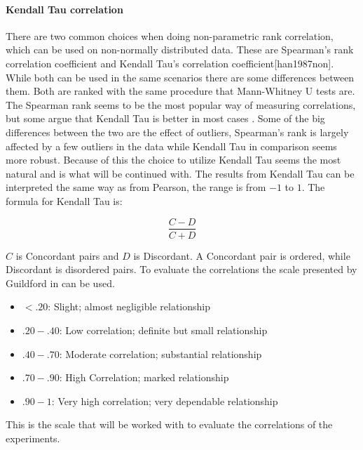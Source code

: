 \paragraph{Kendall Tau correlation}
There are two common choices when doing non-parametric rank correlation, which can be used on non-normally distributed data. These are Spearman's rank correlation coefficient and Kendall Tau's correlation coefficient[han1987non]. While both can be used in the same scenarios there are some differences between them. Both are ranked with the same procedure that Mann-Whitney U tests are. The Spearman rank seems to be the most popular way of measuring correlations, but some argue that Kendall Tau is better in most cases \cite{gilpin1993table}. Some of the big differences between the two are the effect of outliers, Spearman's rank is largely affected by a few outliers in the data while Kendall Tau in comparison seems more robust. Because of this the choice to utilize Kendall Tau seems the most natural and is what will be continued with. The results from Kendall Tau can be interpreted the same way as from Pearson, the range is from $-1$ to $1$. The formula for Kendall Tau is:

\begin{equation}
    \frac{C-D}{C+D}
\end{equation}

$C$ is Concordant pairs and $D$ is Discordant. A Concordant pair is ordered, while Discordant is disordered pairs\cite{kendall1938new}. To evaluate the correlations the scale presented by Guildford in \cite[219]{guilford1950fundamental} can be used.
\begin{itemize}
    \item $<.20$: Slight; almost negligible relationship
    \item $.20-.40$: Low correlation; definite but small relationship
    \item $.40-.70$: Moderate correlation; substantial relationship
    \item $.70-.90$: High Correlation; marked relationship
    \item $.90-1$: Very high correlation; very dependable relationship
\end{itemize}

This is the scale that will be worked with to evaluate the correlations of the experiments.

